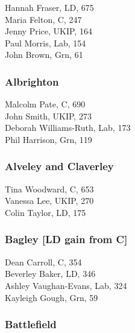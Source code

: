 \documentclass[a4paper,openany,10pt]{book}
\begin{document}


Hannah Fraser, LD, 675\\
Maria Felton, C, 247\\
Jenny Price, UKIP, 164\\
Paul Morris, Lab, 154\\
John Brown, Grn, 61\\


\subsubsection*{Albrighton}



Malcolm Pate, C, 690\\
John Smith, UKIP, 273\\
{Deborah Williams-Ruth}, Lab, 173\\
Phil Harrison, Grn, 119\\


\subsubsection*{Alveley and Claverley}



Tina Woodward, C, 653\\
Vanessa Lee, UKIP, 270\\
Colin Taylor, LD, 175\\


\subsubsection*{Bagley \hspace*{\fill}\nolinebreak[1]%
\enspace\hspace*{\fill}
[LD gain from C]}



Dean Carroll, C, 354\\
Beverley Baker, LD, 346\\
Ashley Vaughan-Evans, Lab, 324\\
Kayleigh Gough, Grn, 59\\


\subsubsection*{Battlefield}
\end{document}
